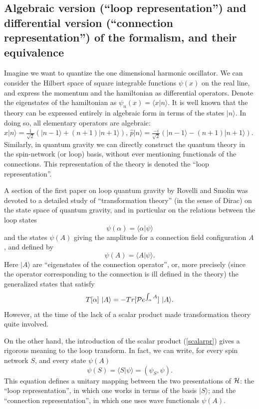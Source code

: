 \documentclass[12pt]{article}
\begin{document}
\subsection{Algebraic version (``loop representation'') and 
differential version (``connection representation'')  of the 
formalism, and their equivalence}

Imagine we want to quantize the one dimensional harmonic oscillator.  
We can consider the Hilbert space of square integrable functions 
$\psi(x)$ on the real line, and express the momentum and the 
hamiltonian as differential operators.  Denote the 
eigenstates of the hamiltonian as $\psi_{n}(x)=\langle x| n\rangle$.  
It is well known that the theory can be expressed entirely in 
algebraic form in terms of the states $|n\rangle$.  In doing so, all 
elementary operators are algebraic: $ \hat x |n\rangle = 
\frac{1}{\sqrt{2}}(|n-1\rangle + (n+1) |n+1\rangle)$, $ \hat p 
|n\rangle = \frac{-i}{\sqrt{2}}(|n-1\rangle - (n+1) |n+1\rangle)$.  
Similarly, in quantum gravity we can directly construct the quantum 
theory in the spin-network (or loop) basis, without ever mentioning 
functionals of the connections.  This representation of the theory is 
denoted the ``loop representation''.

A section of the first paper on loop quantum gravity by Rovelli 
and Smolin \cite{RovelliSmolin90} was devoted to a detailed 
study of ``transformation theory'' (in the sense of Dirac) on the 
state space of quantum gravity, and in particular on the 
relations between the loop states
\begin{equation}
           \psi(\alpha)=\langle\alpha|\psi\rangle
\end{equation}
and the states $\psi(A)$ giving the amplitude for a connection field 
configuration $A$, and defined by
\begin{equation}
           \psi(A)=\langle A|\psi\rangle. 
\end{equation}
Here $|A\rangle$ are ``eigenstates of the connection operator'', 
or, more precisely (since the operator corresponding to the 
connection is ill defined in the theory) the generalized states 
that satisfy
\begin{equation}
    T[\alpha]\ |A\rangle= - Tr[{\cal P}e^{\int_{\alpha}A}]\ |A\rangle. 
\end{equation}
However, at the time of \cite{RovelliSmolin90} the lack of a scalar 
product made transformation theory quite involved. 

On the other hand, the introduction of the scalar product 
(\ref{scalarpr}) gives a rigorous meaning to the loop 
transform.  In fact, we can 
write, for every spin network $S$, and every state $\psi(A)$
  \begin{equation}
	\psi(S)=\langle S|\psi\rangle=
	(\psi_{S},\psi). 
  \end{equation}
This equation defines a unitary mapping between the two 
presentations of $\cal H$: the ``loop representation'', in 
which one works in terms of the basis $|S\rangle$; and the 
``connection representation'', in which one uses wave 
functionals $\psi(A)$.
\end{document}

